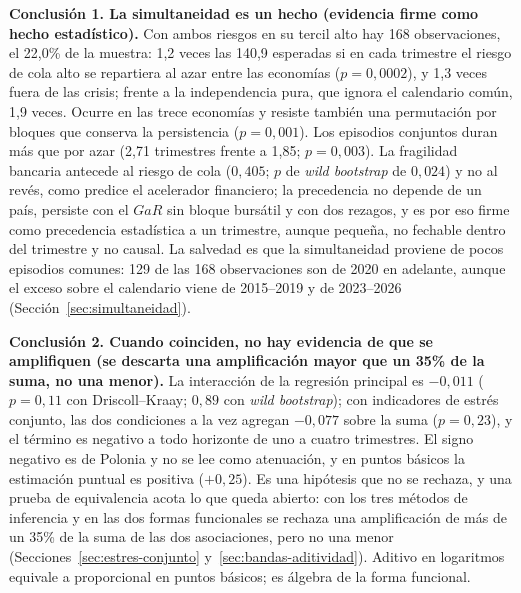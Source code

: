 \textbf{Conclusión 1. La simultaneidad es un hecho (evidencia firme como hecho estadístico).} Con ambos riesgos en su tercil alto hay 168 observaciones, el 22,0\% de la muestra: 1,2 veces las 140,9 esperadas si en cada trimestre el riesgo de cola alto se repartiera al azar entre las economías ($p=0{,}0002$), y 1,3 veces fuera de las crisis; frente a la independencia pura, que ignora el calendario común, 1,9 veces. Ocurre en las trece economías y resiste también una permutación por bloques que conserva la persistencia ($p=0{,}001$). Los episodios conjuntos duran más que por azar (2,71 trimestres frente a 1,85; $p=0{,}003$). La fragilidad bancaria antecede al riesgo de cola ($0{,}405$; $p$ de \textit{wild bootstrap} de $0{,}024$) y no al revés, como predice el acelerador financiero; la precedencia no depende de un país, persiste con el $GaR$ sin bloque bursátil y con dos rezagos, y es por eso firme como precedencia estadística a un trimestre, aunque pequeña, no fechable dentro del trimestre y no causal. La salvedad es que la simultaneidad proviene de pocos episodios comunes: 129 de las 168 observaciones son de 2020 en adelante, aunque el exceso sobre el calendario viene de 2015--2019 y de 2023--2026 (Sección~\ref{sec:simultaneidad}).

\textbf{Conclusión 2. Cuando coinciden, no hay evidencia de que se amplifiquen (se descarta una amplificación mayor que un 35\% de la suma, no una menor).} La interacción de la regresión principal es $-0{,}011$ ($p=0{,}11$ con Driscoll--Kraay; $0{,}89$ con \textit{wild bootstrap}); con indicadores de estrés conjunto, las dos condiciones a la vez agregan $-0{,}077$ sobre la suma ($p=0{,}23$), y el término es negativo a todo horizonte de uno a cuatro trimestres. El signo negativo es de Polonia y no se lee como atenuación, y en puntos básicos la estimación puntual es positiva ($+0{,}25$). Es una hipótesis que no se rechaza, y una prueba de equivalencia acota lo que queda abierto: con los tres métodos de inferencia y en las dos formas funcionales se rechaza una amplificación de más de un 35\% de la suma de las dos asociaciones, pero no una menor (Secciones~\ref{sec:estres-conjunto} y~\ref{sec:bandas-aditividad}). Aditivo en logaritmos equivale a proporcional en puntos básicos; es álgebra de la forma funcional.

